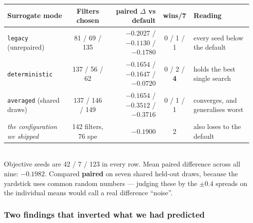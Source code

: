 \documentclass[11pt]{article}
\newcommand{\dl}{\ensuremath{\Delta}}
\begin{document}
\begin{center}\small
\begin{tabularx}{\linewidth}{@{}l c r c X@{}}
\toprule
\textbf{Surrogate mode} & \textbf{Filters chosen} & \textbf{paired \dl{} vs default} & \textbf{wins/7} & \textbf{Reading} \\
\midrule
\texttt{legacy} (unrepaired) & 81 / 69 / 135 & $-0.2027$ / $-0.1130$ / $-0.1780$ & 0 / 1 / 1 & every seed below the default \\
\texttt{deterministic} & 137 / 56 / 62 & $-0.1654$ / $-0.1647$ / $\mathbf{-0.0720}$ & 0 / 2 / \textbf{4} & holds the best single search \\
\texttt{averaged} (shared draws) & 137 / 146 / 149 & $-0.1654$ / $-0.3512$ / $-0.3716$ & 0 / 1 / 1 & converges, and generalises worst \\
\midrule
\emph{the configuration we shipped} & 142 filters, 76 spe & $-0.1900$ & 2 & also loses to the default \\
\bottomrule
\end{tabularx}\\[3pt]
{\footnotesize Objective seeds are 42 / 7 / 123 in every row. Mean paired difference across all nine:
$\mathbf{-0.1982}$. Compared \textbf{paired} on seven shared held-out draws, because the yardstick uses
common random numbers --- judging these by the $\pm 0.4$ spreads on the individual means would call a
real difference ``noise''.}
\end{center}

\subsubsection*{Two findings that inverted what we had predicted}
\end{document}
